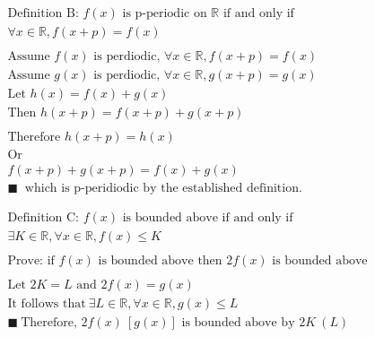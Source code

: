 \documentclass{article}
\begin{document}
\begin{gather*}
\\ \\ \\ 

\text{Definition B: }f(x) \text{ is p-periodic on } \mathbb{R} \text{ if and only if} \\
\forall x \in \mathbb{R}, f(x+p) = f(x)
\\ \\ 
\text{Assume } f(x) \text{ is perdiodic, } \forall x \in \mathbb{R}, f(x+p) = f(x) \\
\text{Assume } g(x) \text{ is perdiodic, } \forall x \in \mathbb{R}, g(x+p) = g(x) \\
\text{Let }h(x) = f(x)+g(x) \\
\text{Then } h(x+p)=f(x+p)+g(x+p)
\\ \\
\text{Therefore }h(x+p)=h(x) \\
\text{Or} \\
f(x+p)+g(x+p) = f(x) + g(x) \\
\blacksquare \ \text{ which is p-peridiodic by the established definition.} \\ \\ \\

\text{Definition C: } f(x) \text{ is bounded above if and only if} \\
\exists K \in \mathbb{R}, \forall x \in \mathbb{R}, f(x) \le K \\ \\
\text{Prove: if } 𝑓(𝑥) \text{ is bounded above then } 2 𝑓(𝑥) \text{ is bounded above} \\ \\
\text{Let } 2K = L \text{ and }2f(x) = g(x)\\
\text{It follows that} \ 
\exists L \in \mathbb{R}, \forall x \in \mathbb{R}, g(x) \le L \\
\blacksquare \ \text{Therefore, } 2f(x) \ [g(x)] \text{ is bounded above by } 2K \ (L)
\end{gather*}
\end{document}
